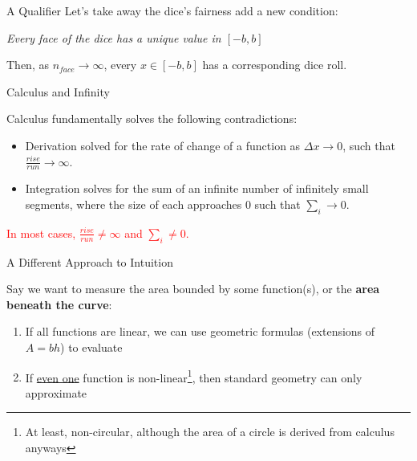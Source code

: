 \documentclass[10pt]{beamer}
\begin{document}
\begin{frame}{A Qualifier}
    Let's take away the dice's fairness add a new condition: \\

    \vspace{.5cm}

    \textit{Every face of the dice has a unique value in $[-b,b]$} \\

    \vspace{.5cm}

    Then, as $n_{face} \to \infty$, every $x \in [-b,b]$ has a corresponding dice roll.

\end{frame}

\begin{frame}{Calculus and Infinity}

Calculus fundamentally solves the following contradictions: \\
\vspace{1cm}
\begin{itemize}

    \item Derivation solved for the rate of change of a function as $\Delta x \to 0$, such that $\frac{rise}{run} \to \infty$.
    
    \item Integration solves for the sum of an infinite number of infinitely small segments, where the size of each approaches $0$ such that $\sum_i \to 0$.

\end{itemize}

\textcolor{red}{In most cases, $\frac{rise}{run} \neq \infty$ and $\sum_i \neq 0$.}

\end{frame}

\begin{frame}{A Different Approach to Intuition}

    Say we want to measure the area bounded by some function(s), or the \textbf{area beneath the curve}:

    \begin{enumerate}
        \item If all functions are linear, we can use geometric formulas (extensions of $A = bh$) to evaluate
        \item If \underline{even one} function is non-linear\footnote{At least, non-circular, although the area of a circle is derived from calculus anyways}, then standard geometry can only approximate
    \end{enumerate}

\end{frame}
\end{document}
